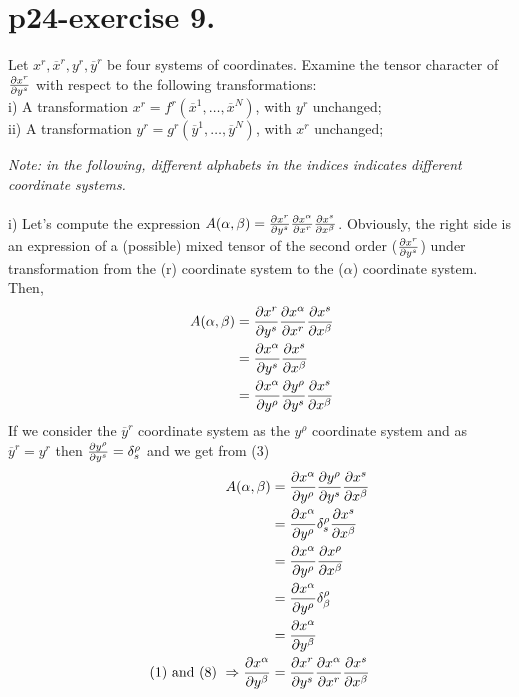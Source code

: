 \section{p24-exercise 9.}
\begin{tcolorbox}
Let $x^r, \overline{x}^r, y^r,\overline{y}^r $ be four systems of coordinates. Examine the tensor character of $\pdv{x^r}{y^s}$ with respect to the following transformations:\\
i) A transformation $x^r = f^r(\overline{x}^1,\dots,\overline{x}^N)$, with $y^r$ unchanged;\\
ii) A transformation $y^r = g^r(\overline{y}^1,\dots,\overline{y}^N)$, with $x^r$ unchanged;
\end{tcolorbox}
\textit{Note: in the following, different alphabets in the indices indicates different coordinate systems.}\\\\
i) Let's compute the expression $A(\alpha, \beta) = \pdv{x^r}{y^s}\pdv{x^{\alpha}}{x^r}\pdv{x^s}{x^{\beta }}$. Obviously, the right side is an expression of a (possible) mixed tensor of the second order ($\pdv{x^r}{y^s}$) under transformation from the (r) coordinate system to the ($\alpha$) coordinate system. Then, 
\begin{align}
\ A(\alpha, \beta) &= \pdv{x^r}{y^s}\pdv{x^{\alpha}}{x^r}\pdv{x^s}{x^{\beta }}\\
&= \pdv{x^{\alpha}}{y^s}\pdv{x^s}{x^{\beta }}\\
&= \pdv{x^{\alpha}}{y^{\rho}}\pdv{y^{\rho }}{y^s}\pdv{x^s}{x^{\beta }}
\end{align}
If we consider the $\overline{y}^r$ coordinate system as the $y^{\rho }$ coordinate system and as $\overline{y}^r = y^r$ then $\pdv{y^{\rho }}{y^s} = \delta^{\rho}_s$ and we get from (3)
\begin{align}
\ A(\alpha, \beta) &= \pdv{x^{\alpha}}{y^{\rho}}\pdv{y^{\rho }}{y^s}\pdv{x^s}{x^{\beta }}\\
\ &= \pdv{x^{\alpha}}{y^{\rho}}\delta^{\rho}_{s}\pdv{x^s}{x^{\beta }}\\
\ &= \pdv{x^{\alpha}}{y^{\rho}}\pdv{x^{\rho}}{x^{\beta }}\\
\ &= \pdv{x^{\alpha}}{y^{\rho}}\delta^{\rho}_{\beta }\\
\ &= \pdv{x^{\alpha}}{y^{\beta}}\\
\text{(1) and (8)   } \Rightarrow \pdv{x^{\alpha}}{y^{\beta}} &= \pdv{x^r}{y^s}\pdv{x^{\alpha}}{x^r}\pdv{x^s}{x^{\beta }}
\end{align}
